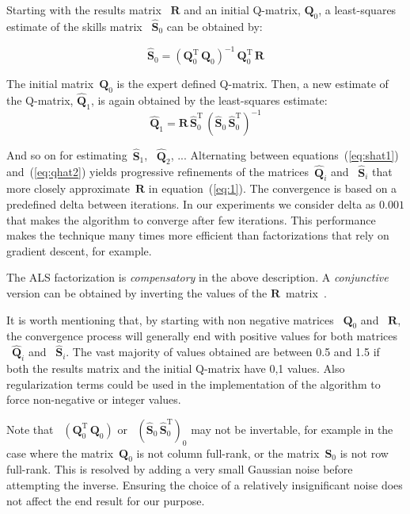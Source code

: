 Starting with the results matrix ~$\mathbf{R}$ and an initial Q-matrix, $\mathbf{Q}_0$, a least-squares estimate of the skills matrix ~$\mathbf{\hat{S}}_0$ can be obtained by:

\begin{equation}
    \mathbf{\hat{S}}_0 = (\mathbf{Q}_0^{\mathrm{T}}  \, \mathbf{Q}_0)^{-1} \, \mathbf{Q}_0^{\mathrm{T}} \, \mathbf{R} \label{eq:shat1}
\end{equation}


The initial matrix~$\mathbf{{Q}}_0$ is the expert defined Q-matrix. Then, a new estimate of the Q-matrix, $\mathbf{\hat{Q}}_1$, is again obtained by the least-squares estimate:
\begin{equation}
  \mathbf{\hat{Q}}_1 = \mathbf{R} \, \mathbf{\hat{S}}_0^{\mathrm{T}} \, (\mathbf{\hat{S}}_0 \, \mathbf{\hat{S}}_0^{\mathrm{T}})^{-1} \label{eq:qhat2}
\end{equation}

And so on for estimating~$\mathbf{\hat{S}}_1$, ~$\mathbf{\hat{Q}}_2$, ... Alternating between equations~(\ref{eq:shat1}) and~(\ref{eq:qhat2}) yields progressive refinements of the matrices~$\mathbf{\hat{Q}}_i$ and ~$\mathbf{\hat{S}}_i$ that more closely approximate~$\mathbf{R}$ in equation~(\ref{eq:1}).  The convergence is based on a predefined delta between iterations. In our experiments we consider delta as $0.001$ that makes the algorithm to converge after few iterations. This performance makes the technique many times more efficient than factorizations that rely on gradient descent, for example.

The ALS factorization is \textit{compensatory} in the above description.  A \textit{conjunctive} version can be obtained by inverting the values of the $\mathbf{R}$~matrix~\citep{Desmarais2012b}.  

It is worth mentioning that, by starting with non negative matrices ~$\mathbf{{Q}}_0$ and ~$\mathbf{R}$, the convergence process will generally end with positive values for both matrices ~$\mathbf{\hat{Q}}_i$ and ~$\mathbf{\hat{S}}_i$. The vast majority of values obtained are between 0.5 and 1.5 if both the results matrix and the initial Q-matrix have {0,1} values. Also regularization terms could be used in the implementation of the algorithm to force non-negative or integer values.

Note that ~$(\mathbf{Q}_0^{\mathrm{T}} \, \mathbf{Q}_0)$ or ~$(\mathbf{\hat{S}}_0 \,\mathbf{\hat{S}}_0^{\mathrm{T}})_0$ may not be invertable, for example in the case where the matrix~$\mathbf{Q}_0$ is not column full-rank, or the matrix~$\mathbf{S}_0$ is not row full-rank.  This is resolved by adding a very small Gaussian noise before attempting the inverse.  Ensuring the choice of a relatively insignificant noise does not affect the end result for our purpose. 


